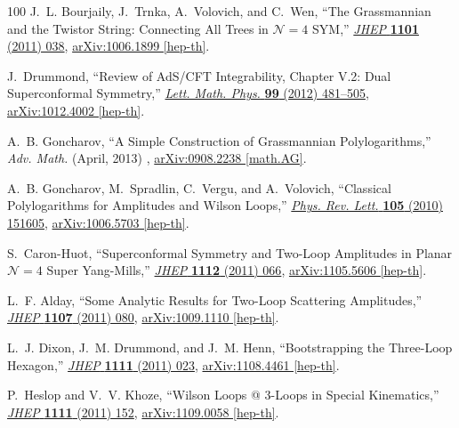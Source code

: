 \documentclass[12pt,hyperref,compress]{JHEP3}
\begin{document}
\begin{thebibliography}{100}
J.~L. Bourjaily, J.~Trnka, A.~Volovich, and C.~Wen, ``{The Grassmannian and the
  Twistor String: Connecting All Trees in $\mathcal{N}\!=\!4$ SYM},''
  \href{http://dx.doi.org/10.1007/JHEP01(2011)038}{{\em JHEP} {\bf 1101} (2011)
   038},
\href{http://arxiv.org/abs/1006.1899}{{ arXiv:1006.1899 [hep-th]}}.

J.~Drummond, ``{Review of AdS/CFT Integrability, Chapter V.2: Dual
  Superconformal Symmetry},''
  \href{http://dx.doi.org/10.1007/s11005-011-0519-4}{{\em Lett. Math. Phys.}
  {\bf 99} (2012)  481--505},
\href{http://arxiv.org/abs/1012.4002}{{ arXiv:1012.4002 [hep-th]}}.

A.~B. {Goncharov}, ``{A Simple Construction of Grassmannian Polylogarithms},''
  {\em {Adv. Math.}} (April, 2013)  , \href{http://arxiv.org/abs/0908.2238}{{
  arXiv:0908.2238 [math.AG]}}.

A.~B. Goncharov, M.~Spradlin, C.~Vergu, and A.~Volovich, ``{Classical
  Polylogarithms for Amplitudes and Wilson Loops},''
  \href{http://dx.doi.org/10.1103/PhysRevLett.105.151605}{{\em Phys. Rev.
  Lett.} {\bf 105} (2010)  151605},
\href{http://arxiv.org/abs/1006.5703}{{ arXiv:1006.5703 [hep-th]}}.

S.~Caron-Huot, ``{Superconformal Symmetry and Two-Loop Amplitudes in Planar
  $\mathcal{N}\!=\!4$ Super Yang-Mills},''
  \href{http://dx.doi.org/10.1007/JHEP12(2011)066}{{\em JHEP} {\bf 1112} (2011)
   066},
\href{http://arxiv.org/abs/1105.5606}{{ arXiv:1105.5606 [hep-th]}}.

L.~F. Alday, ``{Some Analytic Results for Two-Loop Scattering Amplitudes},''
  \href{http://dx.doi.org/10.1007/JHEP07(2011)080}{{\em JHEP} {\bf 1107} (2011)
   080},
\href{http://arxiv.org/abs/1009.1110}{{ arXiv:1009.1110 [hep-th]}}.

L.~J. Dixon, J.~M. Drummond, and J.~M. Henn, ``{Bootstrapping the Three-Loop
  Hexagon},'' \href{http://dx.doi.org/10.1007/JHEP11(2011)023}{{\em JHEP} {\bf
  1111} (2011)  023},
\href{http://arxiv.org/abs/1108.4461}{{ arXiv:1108.4461 [hep-th]}}.

P.~Heslop and V.~V. Khoze, ``{Wilson Loops @ 3-Loops in Special Kinematics},''
  \href{http://dx.doi.org/10.1007/JHEP11(2011)152}{{\em JHEP} {\bf 1111} (2011)
   152},
\href{http://arxiv.org/abs/1109.0058}{{ arXiv:1109.0058 [hep-th]}}.


\end{thebibliography}
\end{document}
